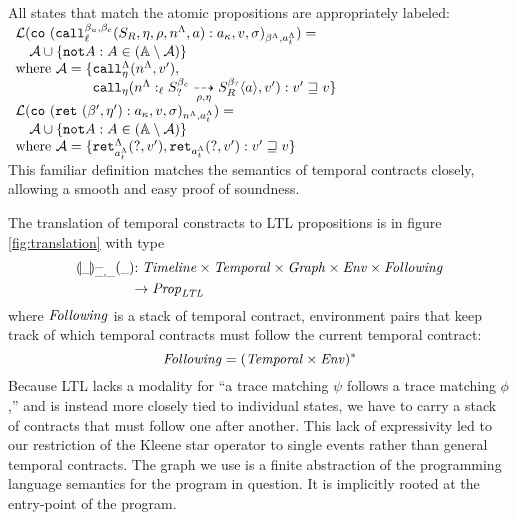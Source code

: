 \documentclass[preprint,onecolumn,9pt]{sigplanconf} %
\begin{document}
All states that match the atomic propositions are appropriately labeled: \\
$
\begin{array}{l}
 \labelof(\co{\spush{\kmcall{\mmlab_u}{\mmlab_c}{\mlab}{\mscon_R, \mtimeline, \menv, \mtoplevelname, \maddr}}{\mkaddr}, \mval, \msto}{\msmlab}{\mstimeline})
  =\\
 \quad \mtconNoB \cup \setbuild{\apneg{\mevent}}{\mevent \in (\ltlactions \setminus \mtconNoB)}
 \\ \text{where } \mtconNoB = \setbuild{\aptopcall{\mtoplevelname}{\mval'}{\mtimeline},\\
                                     \phantom{\text{where } \mtconNoB = \{}\apvcall{\blclos{\mtoplevelname}{\mmlab_?}{\mmlab_c}{\mlab}{\mscon_?}{\mscon_R}{\menv}{\mtimeline}{\maddr}}{\mval'}{\mtimeline}}
                                       {\mval' \sqsupseteq \mval}
\\
 \labelof(\co{\spush{\krt{\mmlab',\mtimeline'}}{\mkaddr}, \mval, \msto}{\mtoplevelname}{\mstimeline}) =\\
 \quad \mtconNoB \cup \setbuild{\apneg{\mevent}}{\mevent \in (\ltlactions \setminus \mtconNoB)}
 \\ \text{where } \mtconNoB = \setbuild{\aptopret{?}{\mval'}{\mstimeline},
                                        \apvret{?}{\mval'}{\mstimeline}}
                                       {\mval' \sqsupseteq \mval}
\end{array}$
\\
This familiar definition matches the semantics of temporal contracts closely, allowing a smooth and easy proof of soundness.

The translation of temporal constracts to LTL propositions is in figure \autoref{fig:translation} with type
\begin{align*}
{\scriptsize \toltl{\_}{\_}{\_}{\_}{\_}} &{\scriptsize : \Timeline \times \TContract \times \Graph \times \Env \times \TConEnvStack}\\ & {\scriptsize \to \LTLProp}
\end{align*}
%
where $\mathit{Following}$ is a stack of temporal contract, environment pairs that keep track of which temporal contracts must follow the current temporal contract:
%
\begin{equation*}
  \mathit{Following} = (\mathit{Temporal} \times \mathit{Env})^*
\end{equation*}
%
Because LTL lacks a modality for ``a trace matching $\psi$ follows a trace matching $\phi$,'' and is instead more closely tied to individual states, we have to carry a stack of contracts that must follow one after another.
%
This lack of expressivity led to our restriction of the Kleene star operator to single events rather than general temporal contracts.
%
The graph we use is a finite abstraction of the programming language semantics for the program in question.
%
It is implicitly rooted at the entry-point of the program.
\end{document}
